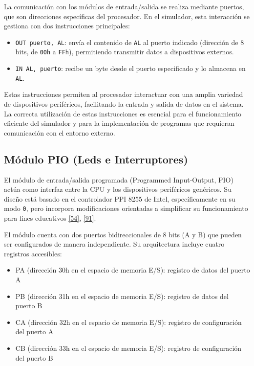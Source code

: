 \documentclass[12pt,oneside]{templates/unerthesis}
\providecommand{\tightlist}{%
  \setlength{\itemsep}{0pt}\setlength{\parskip}{0pt}}
\begin{document}
La comunicación con los módulos de entrada/salida se realiza mediante puertos, que son direcciones específicas del procesador. En el simulador, esta interacción se gestiona con dos instrucciones principales:

\begin{itemize}
\tightlist
\item
  \texttt{OUT\ puerto,\ AL}: envía el contenido de \texttt{AL} al puerto indicado (dirección de 8 bits, de \texttt{00h} a \texttt{FFh}), permitiendo transmitir datos a dispositivos externos.
\item
  \texttt{IN\ AL,\ puerto}: recibe un byte desde el puerto especificado y lo almacena en \texttt{AL}.
\end{itemize}

Estas instrucciones permiten al procesador interactuar con una amplia variedad de dispositivos periféricos, facilitando la entrada y salida de datos en el sistema. La correcta utilización de estas instrucciones es esencial para el funcionamiento eficiente del simulador y para la implementación de programas que requieran comunicación con el entorno externo.

\hypertarget{muxf3dulo-pio-leds-e-interruptores}{%
\subsection{Módulo PIO (Leds e Interruptores)}\label{muxf3dulo-pio-leds-e-interruptores}}

El módulo de entrada/salida programada (Programmed Input-Output, PIO) actúa como interfaz entre la CPU y los dispositivos periféricos genéricos. Su diseño está basado en el controlador PPI 8255 de Intel, específicamente en su modo \texttt{0}, pero incorpora modificaciones orientadas a simplificar su funcionamiento para fines educativos \protect\hyperlink{ref-intel8086manual}{{[}54{]}}, \protect\hyperlink{ref-godse2020microprocessor}{{[}91{]}}.

El módulo cuenta con dos puertos bidireccionales de 8 bits (A y B) que pueden ser configurados de manera independiente. Su arquitectura incluye cuatro registros accesibles:

\begin{itemize}
\tightlist
\item
  PA (dirección 30h en el espacio de memoria E/S): registro de datos del puerto A
\item
  PB (dirección 31h en el espacio de memoria E/S): registro de datos del puerto B
\item
  CA (dirección 32h en el espacio de memoria E/S): registro de configuración del puerto A
\item
  CB (dirección 33h en el espacio de memoria E/S): registro de configuración del puerto B
\end{itemize}
\end{document}
